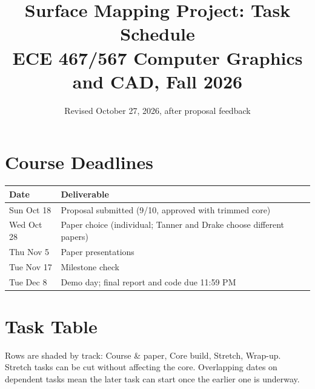 \documentclass[11pt]{article}
\title{Surface Mapping Project: Task Schedule\\[2pt]
\large ECE 467/567 Computer Graphics and CAD, Fall 2026}
\date{Revised October 27, 2026, after proposal feedback}
\author{}
\begin{document}
\maketitle
\vspace{-2em}

\section*{Course Deadlines}
\begin{tabular}{@{}ll@{}}
\toprule
\textbf{Date} & \textbf{Deliverable} \\
\midrule
Sun Oct 18 & Proposal submitted (9/10, approved with trimmed core) \\
Wed Oct 28 & Paper choice (individual; Tanner and Drake choose different papers) \\
Thu Nov 5  & Paper presentations \\
Tue Nov 17 & Milestone check \\
Tue Dec 8  & Demo day; final report and code due 11:59 PM \\
\bottomrule
\end{tabular}

\section*{Task Table}
Rows are shaded by track:
\colorbox{course}{Course \& paper},
\colorbox{core}{Core build},
\colorbox{stretch}{Stretch},
\colorbox{final}{Wrap-up}.
Stretch tasks can be cut without affecting the core. Overlapping dates on dependent tasks mean the later task can start once the earlier one is underway.
\end{document}
